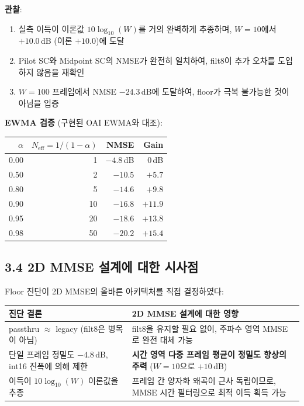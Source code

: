 \documentclass[11pt,a4paper]{article}
\begin{document}
\textbf{관찰}:
\begin{enumerate}[leftmargin=2em]
\item 실측 이득이 이론값 $10\log_{10}(W)$를 거의 완벽하게 추종하며, $W=10$에서 $+10.0$\,dB (이론 $+10.0$)에 도달
\item Pilot SC와 Midpoint SC의 NMSE가 완전히 일치하여, filt8이 추가 오차를 도입하지 않음을 재확인
\item $W=100$ 프레임에서 NMSE $-24.3$\,dB에 도달하여, floor가 극복 불가능한 것이 아님을 입증
\end{enumerate}

\textbf{EWMA 검증} (구현된 OAI EWMA와 대조):

\begin{table}[h]\centering
\begin{tabular}{rrrr}
\toprule
$\alpha$ & $N_{\text{eff}} = 1/(1\!-\!\alpha)$ & NMSE & Gain \\
\midrule
0.00 & 1 & $-4.8$\,dB & 0\,dB \\
0.50 & 2 & $-10.5$ & $+5.7$ \\
0.80 & 5 & $-14.6$ & $+9.8$ \\
0.90 & 10 & $-16.8$ & $+11.9$ \\
0.95 & 20 & $-18.6$ & $+13.8$ \\
0.98 & 50 & $-20.2$ & $+15.4$ \\
\bottomrule
\end{tabular}
\end{table}

\subsection{3.4 2D MMSE 설계에 대한 시사점}

Floor 진단이 2D MMSE의 올바른 아키텍처를 직접 결정하였다:

\begin{table}[h]\centering
\begin{tabular}{p{5cm}p{8cm}}
\toprule
진단 결론 & 2D MMSE 설계에 대한 영향 \\
\midrule
passthru $\approx$ legacy (filt8은 병목이 아님) & filt8을 유지할 필요 없이, 주파수 영역 MMSE로 완전 대체 가능 \\
\addlinespace
단일 프레임 정밀도 $-4.8$\,dB, int16 진폭에 의해 제한 & \textbf{시간 영역 다중 프레임 평균이 정밀도 향상의 주력} ($W=10$으로 $+10$\,dB) \\
\addlinespace
이득이 $10\log_{10}(W)$ 이론값을 추종 & 프레임 간 양자화 왜곡이 근사 독립이므로, MMSE 시간 필터링으로 최적 이득 획득 가능 \\
\bottomrule
\end{tabular}
\end{table}
\end{document}
